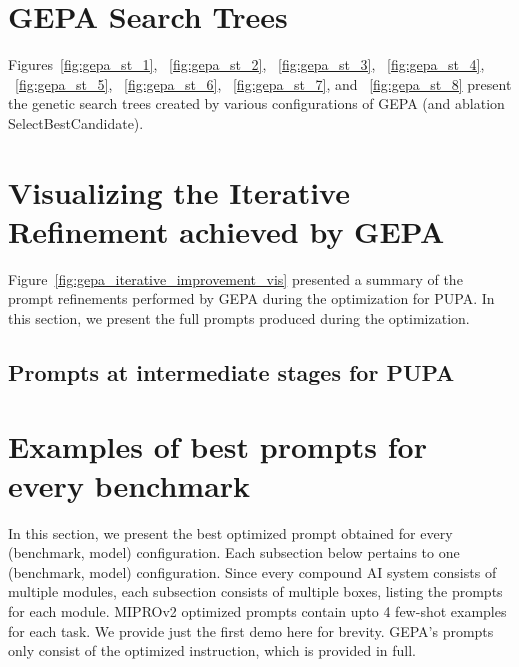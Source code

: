 \documentclass{article} %
\begin{document}
\section{GEPA Search Trees}\label{appendix:gepa_search_trees}

Figures~\ref{fig:gepa_st_1}, ~\ref{fig:gepa_st_2}, ~\ref{fig:gepa_st_3}, ~\ref{fig:gepa_st_4}, ~\ref{fig:gepa_st_5}, ~\ref{fig:gepa_st_6}, ~\ref{fig:gepa_st_7}, and ~\ref{fig:gepa_st_8} present the genetic search trees created by various configurations of GEPA (and ablation SelectBestCandidate).

% 

\section{Visualizing the Iterative Refinement achieved by GEPA}\label{appendix:visualizing_iter_ref}

Figure~\ref{fig:gepa_iterative_improvement_vis} presented a summary of the prompt refinements performed by GEPA during the optimization for PUPA. In this section, we present the full prompts produced during the optimization.


\subsection{Prompts at intermediate stages for PUPA}\label{sec:iterative_vis}


\section{Examples of best prompts for every benchmark}\label{appendix:all_prompts}
In this section, we present the best optimized prompt obtained for every (benchmark, model) configuration. Each subsection below pertains to one (benchmark, model) configuration. Since every compound AI system consists of multiple modules, each subsection consists of multiple boxes, listing the prompts for each module. MIPROv2 optimized prompts contain upto 4 few-shot examples for each task. We provide just the first demo here for brevity. GEPA's prompts only consist of the optimized instruction, which is provided in full.


\end{document}
